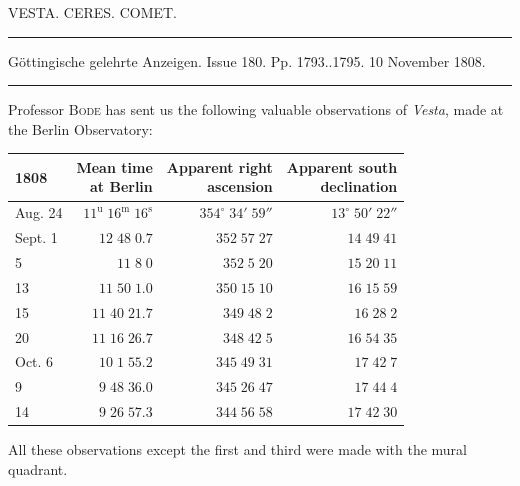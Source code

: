 \clearpage
{}
\begin{center}
VESTA. CERES. COMET.
\end{center}

\par\vspace{4pt}\hrule\vspace{4pt}
\begin{center}
\fontsize{10}{12}\selectfont Göttingische gelehrte Anzeigen. Issue 180. Pp. 1793..1795. 10 November 1808.
\end{center}
\par\vspace{4pt}\hrule\vspace{4pt}

Professor \textsc{Bode} has sent us the following valuable observations of \emph{Vesta}, made at the Berlin Observatory:


\begin{center}\fontsize{10}{12}\selectfont\setlength{\tabcolsep}{5pt}\renewcommand{\arraystretch}{1.15}\begin{tabular}{lrrr}
1808 & \shortstack{Mean time\\at Berlin} & \shortstack{Apparent right\\ascension} & \shortstack{Apparent south\\declination}\\
\hline
Aug. 24 & $11^{\text{u}}\;16^{\text{m}}\;16^{\text{s}}$ & $354^\circ\;34'\;59''$ & $13^\circ\;50'\;22''$\\
Sept. 1 & $12\;48\;0.7$ & $352\;57\;27$ & $14\;49\;41$\\
5 & $11\;8\;0$ & $352\;5\;20$ & $15\;20\;11$\\
13 & $11\;50\;1.0$ & $350\;15\;10$ & $16\;15\;59$\\
15 & $11\;40\;21.7$ & $349\;48\;2$ & $16\;28\;2$\\
20 & $11\;16\;26.7$ & $348\;42\;5$ & $16\;54\;35$\\
Oct. 6 & $10\;1\;55.2$ & $345\;49\;31$ & $17\;42\;7$\\
9 & $9\;48\;36.0$ & $345\;26\;47$ & $17\;44\;4$\\
14 & $9\;26\;57.3$ & $344\;56\;58$ & $17\;42\;30$\\
\end{tabular}\end{center}


\par\indent All these observations except the first and third were made with the mural quadrant.

